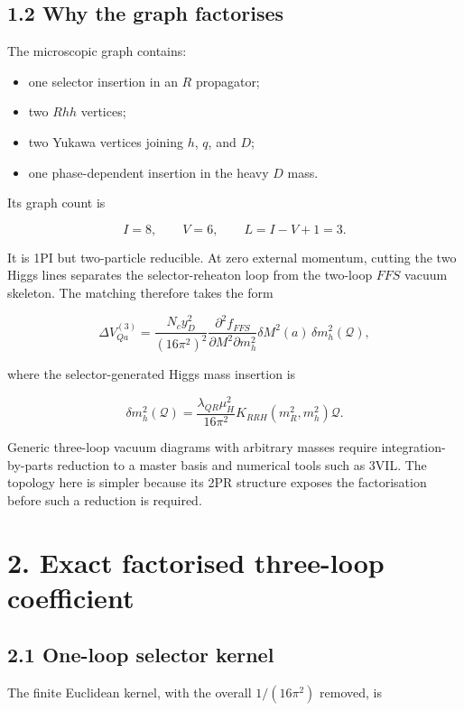 \documentclass[
  10pt,
]{article}
\providecommand{\tightlist}{%
  \setlength{\itemsep}{0pt}\setlength{\parskip}{0pt}}
\begin{document}
\subsection{1.2 Why the graph
factorises}\label{why-the-graph-factorises}

The microscopic graph contains:

\begin{itemize}
\tightlist
\item
  one selector insertion in an \(R\) propagator;
\item
  two \(Rhh\) vertices;
\item
  two Yukawa vertices joining \(h\), \(q\), and \(D\);
\item
  one phase-dependent insertion in the heavy \(D\) mass.
\end{itemize}

Its graph count is

\[
I=8,
\qquad
V=6,
\qquad
L=I-V+1=3.
\]

It is 1PI but two-particle reducible. At zero external momentum, cutting
the two Higgs lines separates the selector-reheaton loop from the
two-loop \(FFS\) vacuum skeleton. The matching therefore takes the form

\[
\Delta V_{Qa}^{(3)}
=
\frac{N_cy_D^2}{(16\pi^2)^2}
\frac{\partial^2f_{FFS}}{\partial M^2\partial m_h^2}
\delta M^2(a)\,
\delta m_h^2(\mathcal Q),
\]

where the selector-generated Higgs mass insertion is

\[
\delta m_h^2(\mathcal Q)
=
\frac{\lambda_{QR}\mu_H^2}{16\pi^2}
K_{RRH}(m_R^2,m_h^2)\mathcal Q.
\]

Generic three-loop vacuum diagrams with arbitrary masses require
integration-by-parts reduction to a master basis and numerical tools
such as 3VIL. The topology here is simpler because its 2PR structure
exposes the factorisation before such a reduction is required.

\section{2. Exact factorised three-loop
coefficient}\label{exact-factorised-three-loop-coefficient}

\subsection{2.1 One-loop selector
kernel}\label{one-loop-selector-kernel}

The finite Euclidean kernel, with the overall \(1/(16\pi^2)\) removed,
is
\end{document}

